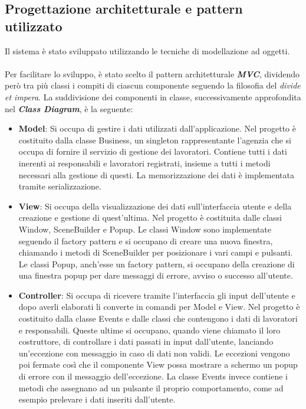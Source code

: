 \documentclass[a4paper,11pt]{article}
\begin{document}
\subsection{Progettazione architetturale e pattern utilizzato}
Il sistema è stato sviluppato utilizzando le tecniche di modellazione ad oggetti.\\
\\Per facilitare lo sviluppo, è stato scelto il pattern architetturale \textbf{\emph{MVC}}, dividendo però tra più classi i compiti di ciascun componente seguendo la filosofia del \emph{divide et impera}. La suddivisione dei componenti in classe, successivamente approfondita nel \textbf{\emph{Class Diagram}}, è la seguente:
\begin{itemize}
	\item \textbf{Model}: Si occupa di gestire i dati utilizzati dall'applicazione. Nel progetto è costituito dalla classe Business, un singleton rappresentante l'agenzia che si occupa di fornire il servizio di gestione dei lavoratori. Contiene tutti i dati inerenti ai responsabili e lavoratori registrati, insieme a tutti i metodi necessari alla gestione di questi. La memorizzazione dei dati è implementata tramite serializzazione.
	\item \textbf{View}: Si occupa della visualizzazione dei dati sull'interfaccia utente e della creazione e gestione di quest'ultima. Nel progetto è costituita dalle classi Window, SceneBuilder e Popup. Le classi Window sono implementate seguendo il factory pattern e si occupano di creare una nuova finestra, chiamando i metodi di SceneBuilder per posizionare i vari campi e pulsanti. Le classi Popup, anch'esse un factory pattern, si occupano della creazione di una finestra popup per dare messaggi di errore, avviso o successo all'utente.
	\item \textbf{Controller}: Si occupa di ricevere tramite l'interfaccia gli input dell'utente e dopo averli elaborati li converte in comandi per Model e View. Nel progetto è costituito dalla classe Events e dalle classi che contengono i dati di lavoratori e responsabili. Queste ultime si occupano, quando viene chiamato il loro costruttore, di controllare i dati passati in input dall'utente, lanciando un'eccezione con messaggio in caso di dati non validi. Le eccezioni vengono poi fermate così che il componente View possa mostrare a schermo un popup di errore con il messaggio dell'eccezione. La classe Events invece contiene i metodi che assegnano ad un pulsante il proprio comportamento, come ad esempio prelevare i dati inseriti dall'utente.
\end{itemize}
\end{document}
